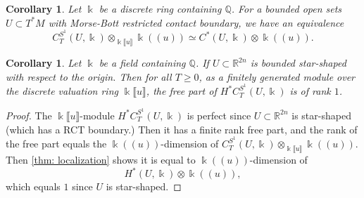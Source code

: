 \documentclass[11pt]{amsart}
\numberwithin{equation}{section}
\theoremstyle{plain}
\newtheorem{Coro}[coro]{Corollary}
\theoremstyle{definition}
\theoremstyle{remark}
\newcommand{\bQ} { {\mathbb{Q}}}
\newcommand{\bR} { {\mathbb{R}}}
\newcommand{\fpw}[1]{{\llbracket #1\rrbracket}}
\newcommand{\fls}[1]{{(\!(#1 )\!) }}
\begin{document}
\begin{Coro}
Let $\Bbbk$ be a discrete ring containing $\bQ$. For a bounded open sets $U\subset T^*M$ with Morse-Bott restricted contact boundary, we have an equivalence
\[C^{S^1}_T(U ,\Bbbk)\otimes_{\Bbbk\fpw{u}} \Bbbk\fls{u} \simeq C^*( {U} ,\Bbbk)\otimes \Bbbk\fls{u}.\]
\end{Coro}

\begin{Coro}Let $\Bbbk$ be a field containing $\bQ$. If $U\subset \bR^{2n}$ is bounded star-shaped with respect to the origin. Then for all $T\geq 0$, as a finitely generated module over the discrete valuation ring $\Bbbk\fpw{u}$, the free part of $H^*C^{S^1}_T(U ,\Bbbk)$ is of rank $1$.    
\end{Coro}
\begin{proof}The $\Bbbk\fpw{u}$-module $H^*C^{S^1}_T(U ,\Bbbk)$ is perfect since $U\subset \bR^{2n}$ is star-shaped (which has a RCT boundary.) Then it has a finite rank free part, and the rank of the free part equals the $\Bbbk\fls{u}$-dimension of $C^{S^1}_T(U ,\Bbbk)\otimes_{\Bbbk\fpw{u}} \Bbbk\fls{u}$. Then \autoref{thm: localization} shows it is equal to $\Bbbk\fls{u}$-dimension of
\[H^*( {U},\Bbbk)\otimes \Bbbk\fls{u},\]
which equals $1$ since $U$ is star-shaped. 
\end{proof}

 
\end{document}
